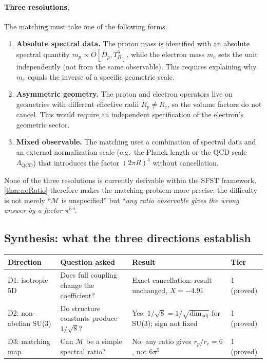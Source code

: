\paragraph{Three resolutions.}
The matching must take one of the following forms.
\begin{enumerate}[label=(\alph*)]
  \item \textbf{Absolute spectral data.}
        The proton mass is identified with an absolute spectral
        quantity $m_p \propto O[D_p, T^5_R]$, while the electron
        mass $m_e$ sets the unit independently (not from the same
        observable).  This requires explaining why $m_e$ equals the
        inverse of a specific geometric scale.
  \item \textbf{Asymmetric geometry.}
        The proton and electron operators live on geometries with
        different effective radii $R_p \neq R_e$, so the volume
        factors do not cancel.  This would require an independent
        specification of the electron's geometric sector.
  \item \textbf{Mixed observable.}
        The matching uses a combination of spectral data and an
        external normalization scale (e.g.\ the Planck length or
        the QCD scale $\Lambda_{\mathrm{QCD}}$) that introduces the
        factor $(2\pi R)^5$ without cancellation.
\end{enumerate}
None of the three resolutions is currently derivable within the
SFST framework.  \cref{thm:noRatio} therefore makes the matching
problem more precise: the difficulty is not merely ``$\mathcal{M}$
is unspecified'' but ``\emph{any ratio observable gives the wrong
answer by a factor $\pi^5$}''.

\subsection{Synthesis: what the three directions establish}
\label{ssec:synthesis}

\begin{center}
\renewcommand{\arraystretch}{1.3}
\begin{tabular}{p{}p{}p{}p{}}
\toprule
Direction & Question asked & Result & Tier \\
\midrule
D1: isotropic 5D &
  Does full coupling change the coefficient? &
  Exact cancellation: result unchanged, $X=-4.91$ &
  1 (proved) \\[4pt]
D2: non-abelian SU(3) &
  Do structure constants produce $1/\sqrt{8}$? &
  Yes: $1/\sqrt{8} = 1/\sqrt{\dim_{\mathrm{adj}}}$ for SU(3); sign not fixed &
  1 (proved) \\[4pt]
D3: matching map &
  Can $\mathcal{M}$ be a simple spectral ratio? &
  No: any ratio gives $r_p/r_e=6$, not $6\pi^5$ &
  1 (proved) \\
\bottomrule
\end{tabular}
\end{center}

